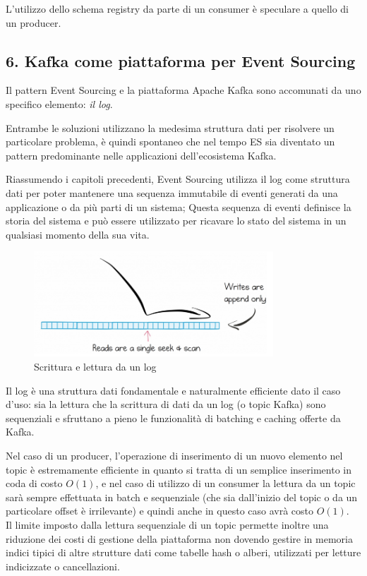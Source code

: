 \documentclass[]{article}
\begin{document}
L'utilizzo dello schema registry da parte di un consumer è speculare a
quello di un producer.

\newpage

\subsection{6. Kafka come piattaforma per Event
Sourcing}\label{kafka-come-piattaforma-per-event-sourcing}

Il pattern Event Sourcing e la piattaforma Apache Kafka sono accomunati
da uno specifico elemento: \emph{il log}.

Entrambe le soluzioni utilizzano la medesima struttura dati per
risolvere un particolare problema, è quindi spontaneo che nel tempo ES
sia diventato un pattern predominante nelle applicazioni dell'ecosistema
Kafka.

Riassumendo i capitoli precedenti, Event Sourcing utilizza il log come
struttura dati per poter mantenere una sequenza immutabile di eventi
generati da una applicazione o da più parti di un sistema; Questa
sequenza di eventi definisce la storia del sistema e può essere
utilizzato per ricavare lo stato del sistema in un qualsiasi momento
della sua vita.

\begin{figure}
\centering
\includegraphics[width=0.80000\textwidth]{../images/log-kafka.png}
\caption{Scrittura e lettura da un log \label{figure_5}}
\end{figure}

Il log è una struttura dati fondamentale e naturalmente efficiente dato
il caso d'uso: sia la lettura che la scrittura di dati da un log (o
topic Kafka) sono sequenziali e sfruttano a pieno le funzionalità di
batching e caching offerte da Kafka.

Nel caso di un producer, l'operazione di inserimento di un nuovo
elemento nel topic è estremamente efficiente in quanto si tratta di un
semplice inserimento in coda di costo \(O(1)\), e nel caso di utilizzo
di un consumer la lettura da un topic sarà sempre effettuata in batch e
sequenziale (che sia dall'inizio del topic o da un particolare offset è
irrilevante) e quindi anche in questo caso avrà costo \(O(1)\).\\
Il limite imposto dalla lettura sequenziale di un topic permette inoltre
una riduzione dei costi di gestione della piattaforma non dovendo
gestire in memoria indici tipici di altre strutture dati come tabelle
hash o alberi, utilizzati per letture indicizzate o cancellazioni.
\end{document}
